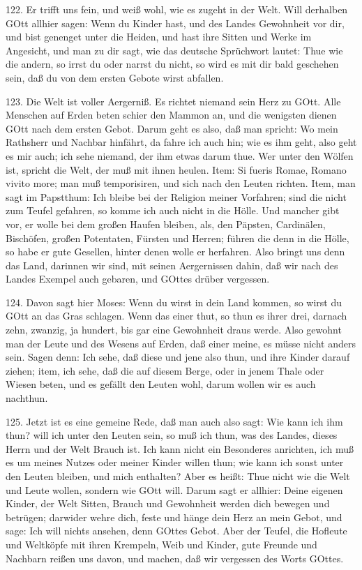 122. Er trifft uns fein, und weiß wohl, wie es zugeht in der Welt. Will derhalben GOtt allhier sagen: Wenn du Kinder hast, und des Landes Gewohnheit vor dir, und bist genenget unter die Heiden, und hast ihre Sitten und Werke im Angesicht, und man zu dir sagt, wie das deutsche Sprüchwort lautet: Thue wie die andern, so irrst du oder narrst du nicht, so wird es mit dir bald geschehen sein, daß du von dem ersten Gebote wirst abfallen.

123. Die Welt ist voller Aergerniß. Es richtet niemand sein Herz zu GOtt. Alle Menschen auf Erden beten schier den Mammon an, und die wenigsten dienen GOtt nach dem ersten Gebot. Darum geht es also, daß man spricht: Wo mein Rathsherr und Nachbar hinfährt, da fahre ich auch hin; wie es ihm geht, also geht es mir auch; ich sehe niemand, der ihm etwas darum thue. Wer unter den Wölfen ist, spricht die Welt, der muß mit ihnen heulen. Item: Si fueris Romae, Romano vivito more; man muß temporisiren, und sich nach den Leuten richten. Item, man sagt im Papstthum: Ich bleibe bei der Religion meiner Vorfahren; sind die nicht zum Teufel gefahren, so komme ich auch nicht in die Hölle. Und mancher gibt vor, er wolle bei dem großen Haufen bleiben, als, den Päpsten, Cardinälen, Bischöfen, großen Potentaten, Fürsten und Herren; führen die denn in die Hölle, so habe er gute Gesellen, hinter denen wolle er herfahren. Also bringt uns denn das Land, darinnen wir sind, mit seinen Aergernissen dahin, daß wir nach des Landes Exempel auch gebaren, und GOttes drüber vergessen.

124. Davon sagt hier Moses: Wenn du wirst in dein Land kommen, so wirst du GOtt an das Gras schlagen. Wenn das einer thut, so thun es ihrer drei, darnach zehn, zwanzig, ja hundert, bis gar eine Gewohnheit draus werde. Also gewohnt man der Leute und des Wesens auf
Erden, daß einer meine, es müsse nicht anders sein. Sagen denn: Ich sehe, daß diese und jene also thun, und ihre Kinder darauf ziehen; item, ich sehe, daß die auf diesem Berge, oder in jenem Thale oder Wiesen beten, und es gefällt den Leuten wohl, darum wollen wir es auch nachthun.

125. Jetzt ist es eine gemeine Rede, daß man auch also sagt: Wie kann ich ihm thun? will ich unter den Leuten sein, so muß ich thun, was des Landes, dieses Herrn und der Welt Brauch ist. Ich kann nicht ein Besonderes anrichten, ich muß es um meines Nutzes oder meiner Kinder willen thun; wie kann ich sonst unter den Leuten bleiben, und mich enthalten? Aber es heißt: Thue nicht wie die Welt und Leute wollen, sondern wie GOtt will. Darum sagt er allhier: Deine eigenen Kinder, der Welt Sitten, Brauch und Gewohnheit werden dich bewegen und betrügen; darwider wehre dich, feste und hänge dein Herz an mein Gebot, und sage: Ich will nichts ansehen, denn GOttes Gebot. Aber der Teufel, die Hofleute und Weltköpfe mit ihren Krempeln, Weib und Kinder, gute Freunde und Nachbarn reißen uns davon, und machen, daß wir vergessen des Worts GOttes.

